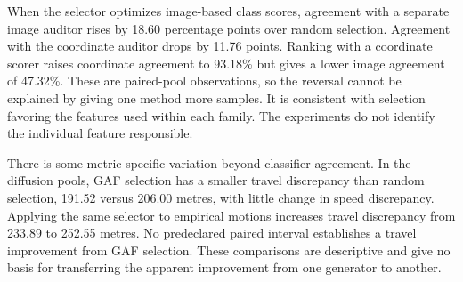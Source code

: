 When the selector optimizes image-based class scores, agreement with a separate image auditor rises by 18.60 percentage points over random selection. Agreement with the coordinate auditor drops by 11.76 points. Ranking with a coordinate scorer raises coordinate agreement to 93.18\% but gives a lower image agreement of 47.32\%. These are paired-pool observations, so the reversal cannot be explained by giving one method more samples. It is consistent with selection favoring the features used within each family. The experiments do not identify the individual feature responsible.

There is some metric-specific variation beyond classifier agreement. In the diffusion pools, GAF selection has a smaller travel discrepancy than random selection, 191.52 versus 206.00 metres, with little change in speed discrepancy. Applying the same selector to empirical motions increases travel discrepancy from 233.89 to 252.55 metres. No predeclared paired interval establishes a travel improvement from GAF selection. These comparisons are descriptive and give no basis for transferring the apparent improvement from one generator to another.

